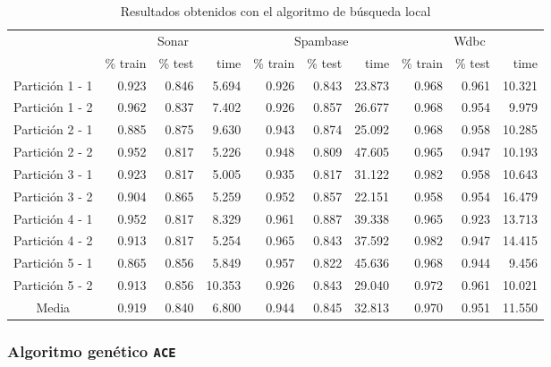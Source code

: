 \documentclass[11pt]{article}
\theoremstyle{plain}
\theoremstyle{definition}
\begin{document}
\begin{table}[H]
\centering
\caption{Resultados obtenidos con el algoritmo de búsqueda local}
\label{tbl-ls}
\begin{tabular}{@{}crrrrrrrrr@{}}
  \toprule
  & \multicolumn{3}{c}{Sonar} & \multicolumn{3}{c}{Spambase} & \multicolumn{3}{c}{Wdbc}  \\
  \cmidrule(r){2-10}
           & \% train & \% test & time & \% train   & \% test   & time & \% train & \% test & time \\
  \midrule
Partición 1 - 1      & 0.923 & 0.846 & 5.694  & 0.926 & 0.843 & 23.873  & 0.968 & 0.961 & 10.321  \\
Partición 1 - 2      & 0.962 & 0.837 & 7.402  & 0.926 & 0.857 & 26.677  & 0.968 & 0.954 & 9.979   \\
Partición 2 - 1      & 0.885 & 0.875 & 9.630  & 0.943 & 0.874 & 25.092  & 0.968 & 0.958 & 10.285  \\
Partición 2 - 2      & 0.952 & 0.817 & 5.226  & 0.948 & 0.809 & 47.605  & 0.965 & 0.947 & 10.193  \\
Partición 3 - 1      & 0.923 & 0.817 & 5.005  & 0.935 & 0.817 & 31.122  & 0.982 & 0.958 & 10.643  \\
Partición 3 - 2      & 0.904 & 0.865 & 5.259  & 0.952 & 0.857 & 22.151  & 0.958 & 0.954 & 16.479  \\
Partición 4 - 1      & 0.952 & 0.817 & 8.329  & 0.961 & 0.887 & 39.338  & 0.965 & 0.923 & 13.713  \\
Partición 4 - 2      & 0.913 & 0.817 & 5.254  & 0.965 & 0.843 & 37.592  & 0.982 & 0.947 & 14.415  \\
Partición 5 - 1      & 0.865 & 0.856 & 5.849  & 0.957 & 0.822 & 45.636  & 0.968 & 0.944 & 9.456   \\
Partición 5 - 2      & 0.913 & 0.856 & 10.353 & 0.926 & 0.843 & 29.040  & 0.972 & 0.961 & 10.021  \\
  \bottomrule
Media                & 0.919 & 0.840 & 6.800  & 0.944 & 0.845 & 32.813  & 0.970 & 0.951 & 11.550  \\
\end{tabular}
\end{table}


\subsubsection{Algoritmo genético \texttt{ACE}}
\end{document}
